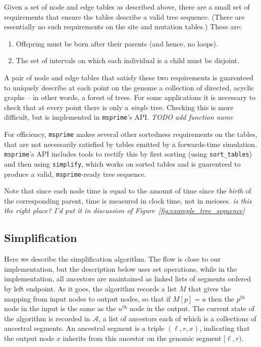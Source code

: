 \documentclass{article}
\newcommand{\msprime}{\texttt{msprime}}
\newcommand{\Al}{\mathcal{A}}  %
\newcommand{\jda}[1]{{\em \color{cyan} #1}}
\begin{document}
Given a set of node and edge tables as described above,
there are a small set of requirements that ensure the tables
describe a valid tree sequence.
(There are essentially no such requirements on the site and mutation tables.)
These are:
\begin{enumerate}
    \item Offspring must be born after their parents (and hence, no loops).
    \item The set of intervals on which each individual is a child must be disjoint.
\end{enumerate}
A pair of node and edge tables that satisfy these two requirements
is guarenteed to uniquely describe at each point on the genome
a collection of directed, acyclic graphs -- in other words, a forest of trees.
For some applications it is necessary to check that at every point
there is only a \emph{single} tree.
Checking this is more difficult, but is implemented in \msprime{}'s API.
\jda{TODO add function name}

For efficiency, \msprime{} makes several other sortedness requirements on the tables,
that are not necessarily satisfied by tables emitted by a forwards-time simulation.
\msprime{}'s API includes tools to rectify this by first sorting (using \texttt{sort\_tables})
and then using \texttt{simplify}, which works on sorted tables
and is guarenteed to produce a valid, \msprime{}-ready tree sequence.

Note that since each node time is equal to the amount of time since the \emph{birth} of the
corresponding parent, time is measured in clock time, not in meioses.
\jda{is this the right place? I'd put it in discussion of Figure~\ref{fig:example_tree_sequence}}


\subsection*{Simplification}

Here we describe the simplification algorithm.
The flow is close to our implementation,
but the description below uses set operations,
while in the implementation,
all ancestors are maintained as linked lists of segments
ordered by left endpoint.
As it goes, the algorithm
records a list $M$ that gives the mapping
from input nodes to output nodes,
so that if $M[p] = u$ then the $p^\text{th}$ node in the input
is the same as the $u^\text{th}$ node in the output.
The current state of the algorithm is recorded in $\Al$,
a list of ancestors
each of which is a collections of ancestral segments.
An ancestral segment is a triple $(\ell, r, x)$,
indicating that the output node $x$ inherits from this ancestor
on the genomic segment $[\ell, r)$.
\end{document}
